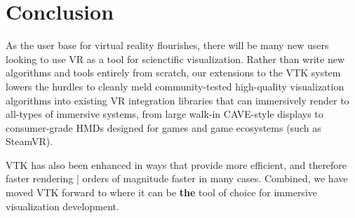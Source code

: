 \section{Conclusion}

As the user base for virtual reality flourishes, there will be many
new users looking to use VR as a tool for scienctific visualization.
Rather than write new algorithms and tools entirely from scratch,
our extensions to the VTK system lowers the hurdles to cleanly
meld community-tested high-quality visualization algorithms into
existing VR integration libraries that can immersively render to
all-types of immersive systems, from large walk-in CAVE-style displays
to consumer-grade HMDs designed for games and game ecosystems (such
as SteamVR).

VTK has also been enhanced in ways that provide more efficient, and
therefore faster rendering | orders of magnitude faster in many cases.
Combined, we have moved VTK forward to where it can be \textbf{the}
tool of choice for immersive visualization development.

